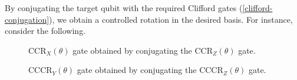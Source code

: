 By conjugating the target qubit with the required Clifford gates (\ref{clifford-conjugation}), we obtain a controlled rotation in the desired basis. For instance, consider the following.

\begin{figure}[H]
    \centering
    \caption{CCR$_X(\theta)$ gate obtained by conjugating the CCR$_Z(\theta)$ gate.}
\end{figure}

\begin{figure}[H]
    \centering
    \caption{CCCR$_Y(\theta)$ gate obtained by conjugating the CCCR$_Z(\theta)$ gate.}
\end{figure}
